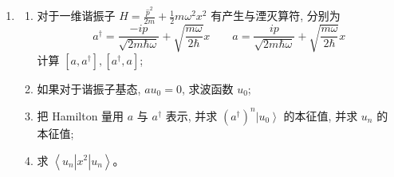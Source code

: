 

\begin{enumerate}
	\item
	\begin{enumerate}
		\item
		对于一维谐振子 $H=\frac{\hat{p}^2}{2 m}+\frac{1}{2} m \omega^2 x^2$ 有产生与湮灭算符, 分别为
		\[
		a ^{\dagger}=\frac{-i p}{\sqrt{2 m \hbar \omega}}+\sqrt{\frac{m \omega}{2 \hbar}} x  \qquad a=\frac{i p}{\sqrt{2 m \hbar \omega}}+\sqrt{\frac{m \omega}{2 \hbar}} x 
		\]
		计算 $[a, a ^{\dagger}],[a ^{\dagger}, a]$;
		\item 
		如果对于谐振子基态, $a u_0=0$, 求波函数 $u_0$;
		\item 
		把 Hamilton 量用 $a$ 与 $a ^{\dagger}$ 表示, 并求 $(a ^{\dagger})^n\left|u_0\right\rangle$ 的本征值, 并求 $u_n$ 的 本征值;
		\item 
		求 $\left\langle u_n\left|x^2\right| u_n\right\rangle$。
		
		
		
	\end{enumerate}
	
\end{enumerate}
